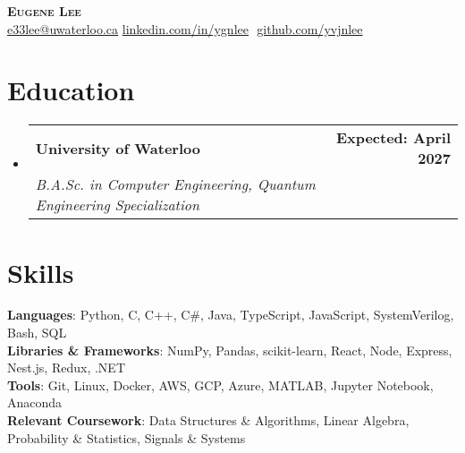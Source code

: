\documentclass[letterpaper,11pt]{article}
\makeatletter
\newcommand{\educationSubheading}[4]{
  \vspace{0pt}\item
    \begin{tabular*}{1.00\textwidth}[t]{l@{\extracolsep{\fill}}r}
      \textbf{#1} & #2 \\
      \textit{\small#3} & \textit{\small #4} \\
    \end{tabular*}\vspace{-2pt}
}
\newcommand{\resumeSubHeadingListStart}{\begin{itemize}[leftmargin=0.0in, label={}]}
\newcommand{\resumeSubHeadingListEnd}{\end{itemize}}
\makeatother
\begin{document}
\begin{flushright}
  \vspace{-8pt}
  \color{gray}
\end{flushright}

\begin{center}
    \textbf{\Huge \scshape Eugene Lee} \\ \vspace{8pt}
    \small
    \href{mailto:e33lee@uwaterloo.ca}{e33lee@uwaterloo.ca}
    \href{https://www.linkedin.com/in/ygnlee/}
    {linkedin.com/in/ygnlee} $  $
    \href{https://github.com/yvjnlee}{github.com/yvjnlee} $  $
\end{center}

\section{Education}
\resumeSubHeadingListStart
  
    \educationSubheading
      {University of Waterloo}{\textbf{Expected: April 2027}}
      {B.A.Sc. in Computer Engineering, Quantum Engineering Specialization}{}

\resumeSubHeadingListEnd

\section{Skills}
\begin{itemize}[leftmargin=0.15in, label={}]
    \small{
        \item 
            \textbf{Languages}: Python, C, C++, C\#, Java, TypeScript, JavaScript, SystemVerilog, Bash, SQL \\
            \textbf{Libraries \& Frameworks}: NumPy, Pandas, scikit-learn, React, Node, Express, Nest.js, Redux, .NET \\
            \textbf{Tools}: Git, Linux, Docker, AWS, GCP, Azure, MATLAB, Jupyter Notebook, Anaconda \\
            \textbf{Relevant Coursework}: Data Structures \& Algorithms, Linear Algebra, Probability \& Statistics, Signals \& Systems \\
    }
\end{itemize}

\end{document}
